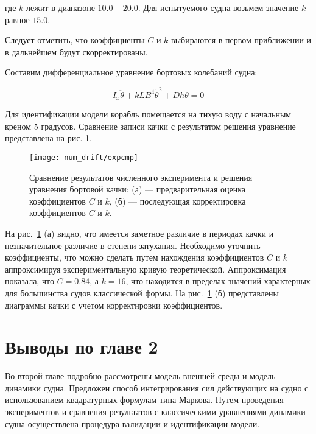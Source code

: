 где $k$ лежит в диапазоне $10.0$ -- $20.0$. Для испытуемого судна возьмем значение $k$ равное $15.0$.

Следует отметить, что коэффициенты $C$ и $k$ выбираются в первом приближении и в дальнейшем будут скорректированы.

Составим дифференциальное уравнение бортовых колебаний судна:

\begin{equation}
	I_x \ddot{\theta} + kLB^4\dot{\theta}^2 + Dh \theta = 0
	\label{roll_eq}
\end{equation}

Для идентификации модели корабль помещается на тихую воду с начальным креном $5$ градусов. Сравнение записи качки с результатом решения уравнение представлена на рис. \ref{drift:expcmp}.

\begin{figure}
	\texttt{[image: num\_drift/expcmp]}
	\caption{Сравнение результатов численного эксперимента и решения уравнения бортовой качки: (а) --- предварительная оценка коэффициентов $C$ и $k$, (б) --- последующая корректировка коэффициентов $C$ и $k$.}
	\label{drift:expcmp}
\end{figure}

На рис.~\ref{drift:expcmp} (а) видно, что имеется заметное различие в периодах качки и незначительное различие в степени затухания. Необходимо уточнить коэффициенты, что можно сделать путем 
нахождения коэффициентов $C$ и $k$ аппроксимируя экспериментальную кривую теоретической.
Аппроксимация показала, что $C=0.84$, а $k=16$, что находится в пределах значений характерных для большинства судов классической формы. На рис.~\ref{drift:expcmp} (б) представлены 
диаграммы качки с учетом корректировки коэффициентов.

%



\section{Выводы по главе 2}

Во второй главе подробно рассмотрены модель внешней среды и модель динамики судна.
Предложен способ интегрирования сил действующих на судно с использованием квадратурных формулам типа Маркова.
Путем проведения экспериментов и сравнения результатов с классическими уравнениями динамики судна осуществлена процедура валидации 
и идентификации модели.








